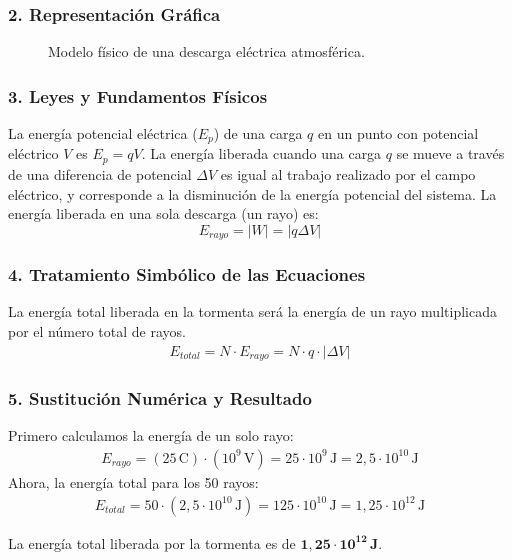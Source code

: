 \subsubsection*{2. Representación Gráfica}
\begin{figure}[H]
    \centering
    \caption{Modelo físico de una descarga eléctrica atmosférica.}
\end{figure}

\subsubsection*{3. Leyes y Fundamentos Físicos}
La energía potencial eléctrica ($E_p$) de una carga $q$ en un punto con potencial eléctrico $V$ es $E_p = qV$.
La energía liberada cuando una carga $q$ se mueve a través de una diferencia de potencial $\Delta V$ es igual al trabajo realizado por el campo eléctrico, y corresponde a la disminución de la energía potencial del sistema.
La energía liberada en una sola descarga (un rayo) es:
$$ E_{rayo} = |W| = |q \Delta V| $$

\subsubsection*{4. Tratamiento Simbólico de las Ecuaciones}
La energía total liberada en la tormenta será la energía de un rayo multiplicada por el número total de rayos.
\begin{gather}
    E_{total} = N \cdot E_{rayo} = N \cdot q \cdot |\Delta V|
\end{gather}

\subsubsection*{5. Sustitución Numérica y Resultado}
Primero calculamos la energía de un solo rayo:
\begin{gather}
    E_{rayo} = (25\,\text{C}) \cdot (10^9\,\text{V}) = 25 \cdot 10^9 \, \text{J} = 2,5 \cdot 10^{10} \, \text{J}
\end{gather}
Ahora, la energía total para los 50 rayos:
\begin{gather}
    E_{total} = 50 \cdot (2,5 \cdot 10^{10} \, \text{J}) = 125 \cdot 10^{10} \, \text{J} = 1,25 \cdot 10^{12} \, \text{J}
\end{gather}
\begin{cajaresultado}
La energía total liberada por la tormenta es de $\boldsymbol{1,25 \cdot 10^{12} \, \textbf{J}}$.
\end{cajaresultado}

